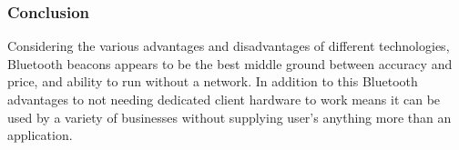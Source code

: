 \subsubsection{Conclusion}
Considering the various advantages and disadvantages of different technologies, Bluetooth beacons appears to be the best middle ground between accuracy and price, and ability to run without a network. In addition to this Bluetooth advantages to not needing dedicated client hardware to work means it can be used by a variety of businesses without supplying user’s anything more than an application. 